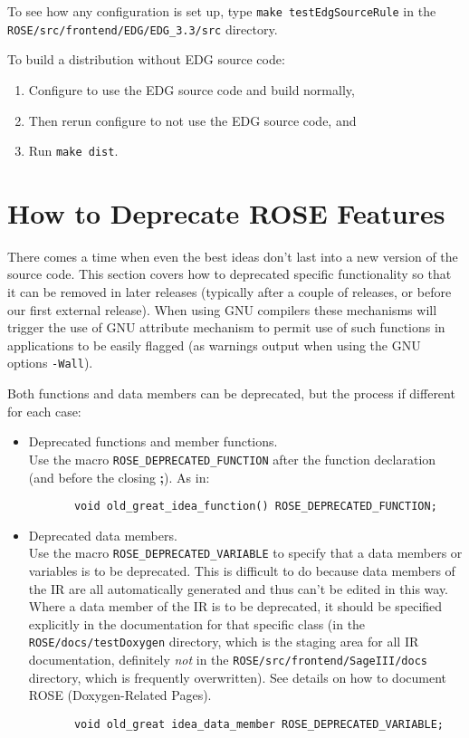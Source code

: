 To see how any configuration is set up, type {\tt make testEdgSourceRule}
in the {\tt ROSE/src/frontend/EDG/EDG\_3.3/src} directory.

To build a distribution without EDG source code:
\begin{enumerate}
   \item Configure to use the EDG source code and build normally, 
   \item Then rerun configure to not use the EDG source code, and
   \item Run {\tt make dist}.
\end{enumerate}


\section{How to Deprecate ROSE Features}

    There comes a time when even the best ideas don't last
into a new version of the source code.  This section covers how to
deprecated specific functionality so that it can be removed in
later releases (typically after a couple of releases, or before
our first external release).  When using GNU compilers these mechanisms
will trigger the use of GNU attribute mechanism to permit use of such
functions in applications to be easily flagged (as warnings
output when using the GNU options {\tt -Wall}).

Both functions and data members can be deprecated, but the process if different 
for each case:
\begin{itemize}
    \item Deprecated functions and member functions. \\
          Use the macro {\tt ROSE\_DEPRECATED\_FUNCTION} after the function declaration (and before
          the closing {\bf ;}). As in:
{\indent
{\mySmallFontSize
\begin{verbatim}
       void old_great_idea_function() ROSE_DEPRECATED_FUNCTION;
\end{verbatim}
}}

    \item Deprecated data members. \\
        Use the macro {\tt ROSE\_DEPRECATED\_VARIABLE} to specify that a data members 
    or variables is to be deprecated.  This is difficult to do because data members of 
    the IR are all automatically generated and thus can't be edited in this way.  Where 
    a data member of the IR is to be deprecated, it should be specified explicitly in
    the documentation for that specific class (in the {\tt ROSE/docs/testDoxygen} directory,
    which is the staging area for all IR documentation, definitely {\em not} in the 
    {\tt ROSE/src/frontend/SageIII/docs} directory, which is frequently overwritten).  See
    details on how to document ROSE (Doxygen-Related Pages).
{\indent
{\mySmallFontSize
\begin{verbatim}
       void old_great idea_data_member ROSE_DEPRECATED_VARIABLE;
\end{verbatim} 
}}
\end{itemize}



